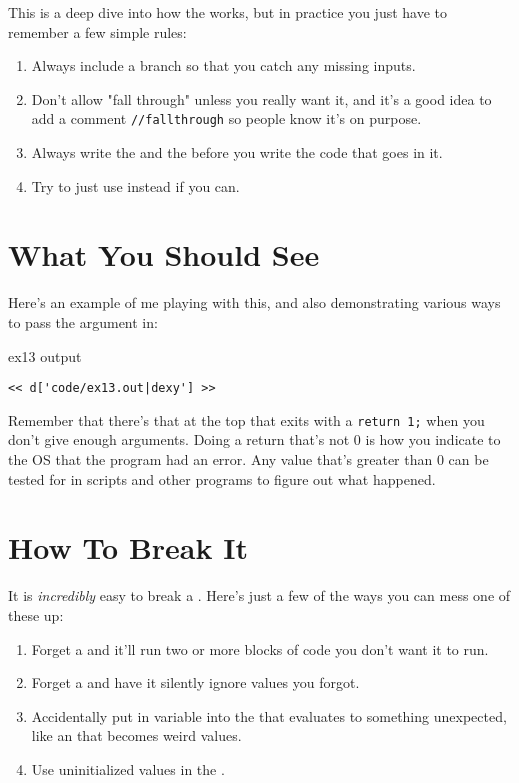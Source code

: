 This is a deep dive into how the  works, but
in practice you just have to remember a few simple rules:

\begin{enumerate}
\item Always include a  branch so that you catch
    any missing inputs.
\item Don't allow "fall through" unless you really want it, and
    it's a good idea to add a comment \verb|//fallthrough| so 
    people know it's on purpose.
\item Always write the  and the  before
    you write the code that goes in it.
\item Try to just use  instead if you can.
\end{enumerate}

\section{What You Should See}

Here's an example of me playing with this, and also demonstrating
various ways to pass the argument in:

\begin{code}{ex13 output}
\begin{lstlisting}
<< d['code/ex13.out|dexy'] >>
\end{lstlisting}
\end{code}

Remember that there's that  at the top that
exits with a \verb|return 1;| when you don't give enough arguments.
Doing a return that's not 0 is how you indicate to the OS that
the program had an error.  Any value that's greater than 0 can be
tested for in scripts and other programs to figure out what
happened.

\section{How To Break It}

It is \emph{incredibly} easy to break a .
Here's just a few of the ways you can mess one of these up:

\begin{enumerate}
\item Forget a  and it'll run two or more
    blocks of code you don't want it to run.
\item Forget a  and have it silently
    ignore values you forgot.
\item Accidentally put in variable into the  that
    evaluates to something unexpected, like an 
    that becomes weird values.
\item Use uninitialized values in the .
\end{enumerate}

